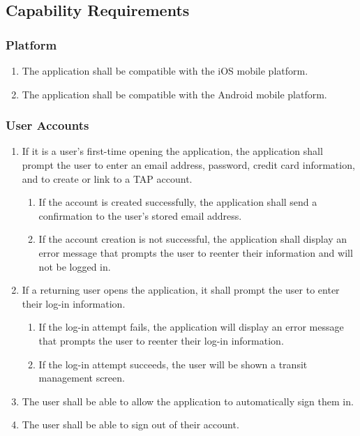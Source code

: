 \subsection{Capability Requirements}

	\subsubsection{Platform}\begin{enumerate}
		\item The application shall be compatible with the iOS mobile platform.
		\item The application shall be compatible with the Android mobile platform.
	\end{enumerate}
	
	\subsubsection{User Accounts}\begin{enumerate}
		\item If it is a user’s first-time opening the application, the application shall prompt the user to enter an email address, password, credit card information, and to create or link to a TAP account.
		\begin{enumerate}
			\item If the account is created successfully, the application shall send a confirmation to the user’s stored email address.
			\item If the account creation is not successful, the application shall display an error message that prompts the user to reenter their information and will not be logged in.
		\end{enumerate}
		\item If a returning user opens the application, it shall prompt the user to enter their log-in information.
			\begin{enumerate}
				\item If the log-in attempt fails, the application will display an error message that prompts the user to reenter their log-in information.
				\item If the log-in attempt succeeds, the user will be shown a transit management screen.
			\end{enumerate}
		\item The user shall be able to allow the application to automatically sign them in.
		\item The user shall be able to sign out of their account.
	\end{enumerate}
	
